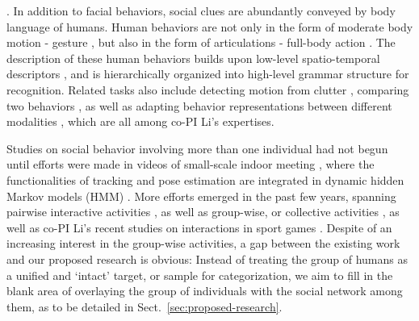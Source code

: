 . In addition to facial behaviors, social clues are abundantly conveyed by body language of humans. Human behaviors are not only in the form of moderate body motion - gesture \cite{Mitra:gesture}, but also in the form of articulations - full-body action \cite{Ryoo:action,Poppe}. The description of these human behaviors builds upon low-level spatio-temporal descriptors \cite{Dalal:HOG,Dollar:STIP,Laptev:STIP,Brox:flow}, and is hierarchically organized into high-level grammar structure \cite{Niebles2007,Niebles2006} for recognition.  Related tasks also include detecting motion from clutter \cite{Li2010}, comparing two behaviors \cite{LiPAMI 2012}, as well as adapting behavior representations between different modalities \cite{LiZickler2012,Li2011}, which are all among co-PI Li's expertises.

Studies on social behavior involving more than one individual had not begun until efforts were made in videos of small-scale indoor meeting \cite{GaticaPerez,McCowan:meeting}, where the functionalities of tracking \cite{Smith:track} and pose estimation \cite{Ba:meeting} are integrated in dynamic hidden Markov models (HMM) \cite{Zhang:meeting}. More efforts emerged in the past few years, spanning pairwise interactive activities \cite{UTdata}, as well as group-wise, or collective activities \cite{Choi:context,Choi:recogtrack,Amer:group,Lan:Group}, as well as co-PI Li's recent studies on interactions in sport games \cite{LiIJCV2012}.  Despite of an increasing interest in the group-wise activities, a gap between the existing work and our proposed research is obvious: Instead of treating the group of humans as a unified and `intact' target, or sample for categorization, we aim to fill in the blank area of overlaying the group of individuals with the social network among them, as to be detailed in Sect.~\ref{sec:proposed-research}.



